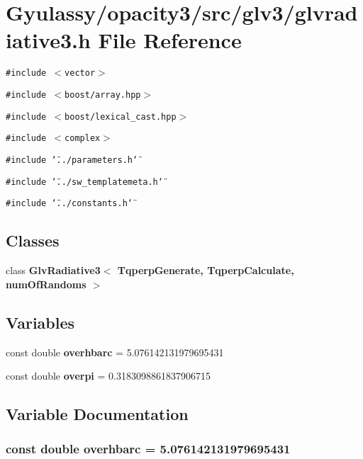 \section{Gyulassy/opacity3/src/glv3/glvradiative3.h File Reference}
\label{glvradiative3_8h}
{\tt \#include $<$vector$>$}\par
{\tt \#include $<$boost/array.hpp$>$}\par
{\tt \#include $<$boost/lexical\_\-cast.hpp$>$}\par
{\tt \#include $<$complex$>$}\par
{\tt \#include \char`\"{}../parameters.h\char`\"{}}\par
{\tt \#include \char`\"{}../sw\_\-templatemeta.h\char`\"{}}\par
{\tt \#include \char`\"{}../constants.h\char`\"{}}\par
\subsection*{Classes}
\begin{CompactItemize}
\item 
class {\bf GlvRadiative3$<$ TqperpGenerate, TqperpCalculate, numOfRandoms $>$}
\end{CompactItemize}
\subsection*{Variables}
\begin{CompactItemize}
\item 
const double {\bf overhbarc} = 5.076142131979695431
\item 
const double {\bf overpi} = 0.3183098861837906715
\end{CompactItemize}


\subsection{Variable Documentation}
\subsubsection{\setlength{\rightskip}{0pt plus 5cm}const double {\bf overhbarc} = 5.076142131979695431\hspace{0.3cm}{\tt  [static]}}\label{glvradiative3_8h_212b6393a6fc6ddd24cb0f65432e7292}




